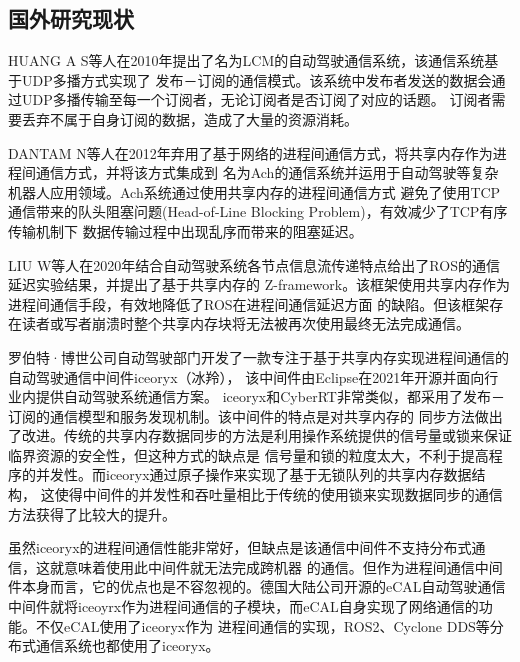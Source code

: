 \subsection{国外研究现状}
HUANG A S等人在2010年提出了名为LCM\cite{2010LCM}的自动驾驶通信系统，该通信系统基于UDP多播方式实现了
发布－订阅的通信模式。该系统中发布者发送的数据会通过UDP多播传输至每一个订阅者，无论订阅者是否订阅了对应的话题。
订阅者需要丢弃不属于自身订阅的数据，造成了大量的资源消耗。

DANTAM N等人在2012年弃用了基于网络的进程间通信方式，将共享内存作为进程间通信方式，并将该方式集成到
名为Ach\cite{6651538}的通信系统并运用于自动驾驶等复杂机器人应用领域。Ach系统通过使用共享内存的进程间通信方式
避免了使用TCP通信带来的队头阻塞问题(Head-of-Line Blocking Problem)，有效减少了TCP有序传输机制下
数据传输过程中出现乱序而带来的阻塞延迟\cite{8863328}。

LIU W等人在2020年结合自动驾驶系统各节点信息流传递特点给出了ROS的通信延迟实验结果，并提出了基于共享内存的
Z-framework\cite{2020memory}。该框架使用共享内存作为进程间通信手段，有效地降低了ROS在进程间通信延迟方面
的缺陷。但该框架存在读者或写者崩溃时整个共享内存块将无法被再次使用最终无法完成通信。


罗伯特·博世公司自动驾驶部门开发了一款专注于基于共享内存实现进程间通信的自动驾驶通信中间件iceoryx（冰羚），
该中间件由Eclipse在2021年开源并面向行业内提供自动驾驶系统通信方案。
iceoryx和CyberRT非常类似，都采用了发布－订阅的通信模型和服务发现机制。该中间件的特点是对共享内存的
同步方法做出了改进。传统的共享内存数据同步的方法是利用操作系统提供的信号量或锁来保证临界资源的安全性，但这种方式的缺点是
信号量和锁的粒度太大，不利于提高程序的并发性。而iceoryx通过原子操作来实现了基于无锁队列的共享内存数据结构，
这使得中间件的并发性和吞吐量相比于传统的使用锁来实现数据同步的通信方法获得了比较大的提升\cite{iceoryx}。

虽然iceoryx的进程间通信性能非常好，但缺点是该通信中间件不支持分布式通信，这就意味着使用此中间件就无法完成跨机器
的通信。但作为进程间通信中间件本身而言，它的优点也是不容忽视的。德国大陆公司开源的eCAL自动驾驶通信
中间件就将iceoyrx作为进程间通信的子模块，而eCAL自身实现了网络通信的功能。不仅eCAL使用了iceoryx作为
进程间通信的实现，ROS2、Cyclone DDS等分布式通信系统也都使用了iceoryx\cite{ecal}。


